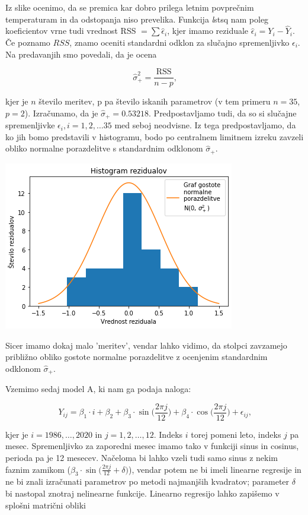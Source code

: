 \documentclass[12pt, a4paper]{article}
\begin{document}
Iz slike ocenimo, da se premica kar dobro prilega letnim povprečnim temperaturam 
in da odstopanja niso prevelika. Funkcija \emph lstsq nam poleg koeficientov vrne
tudi vrednost RSS $= \sum \hat{\epsilon}_i$, kjer imamo reziduale $\hat{\epsilon}_i
 = Y_i - \hat{Y}_i$. Če poznamo $RSS$, znamo oceniti standardni odklon za slučajno
 spremenljivko $\epsilon_i$. Na predavanjih smo povedali, da je ocena 
 
$$ \hat{\sigma}^2_+ = \frac{\text{RSS}}{n-p} \text{,}
$$

kjer je $n$ število meritev, p pa število iskanih parametrov (v tem primeru $n = 35$,
$p=2$). Izračunamo, da je $\hat{\sigma}_+ = 0.53218$. Predpostavljamo tudi, da so si
slučajne spremenljivke $\epsilon_i, i = 1, 2, \dots 35$ med seboj neodvisne. Iz tega 
predpostavljamo, da ko jih bomo predstavili v histogramu, bodo po centralnem limitnem 
izreku zavzeli obliko normalne porazdelitve s standardnim odklonom $\hat{\sigma}_+$.

\begin{center}
    \includegraphics[scale=0.5]{Naloga_3_04}
\end{center}

Sicer imamo dokaj malo 'meritev', vendar lahko vidimo, da stolpci zavzamejo približno 
obliko gostote normalne porazdelitve z ocenjenim standardnim odklonom $\hat{\sigma}_+$.

Vzemimo sedaj model A, ki nam ga podaja naloga:

\[
    Y_{ij} = \beta_1 \cdot i + \beta_2 + \beta_3 \cdot \sin \Big(\frac{2\pi j}{12}\Big) 
    + \beta_4 \cdot \cos \Big(\frac{2\pi j}{12}\Big) + \epsilon_{ij} \text{,}
\]

kjer je $i=1986,\dots,2020$ in $j=1,2,\dots,12$. Indeks $i$ torej pomeni leto, indeks 
$j$ pa mesec. Spremenljivko za zaporedni mesec imamo tako v funkciji sinus in cosinus, 
perioda pa je 12 mesecev. 
Načeloma bi lahko vzeli tudi samo sinus z nekim faznim zamikom ($\beta_3 \cdot\sin 
\big(\frac{2\pi j}{12} + \delta \big)$), vendar potem 
ne bi imeli linearne regresije in ne bi znali izračunati parametrov po metodi najmanjših 
kvadratov; parameter $\delta$ bi nastopal znotraj nelinearne funkcije.
Linearno regresijo lahko zapišemo v splošni matrični obliki
\end{document}
